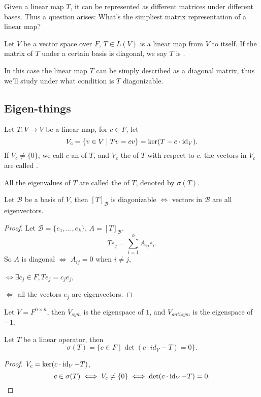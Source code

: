 Given a linear map $T$, it can be represented as different matrices
under different bases. Thus a question arises: What's the simpliest
matrix representation of a linear map?

\begin{definition}
	Let $V$ be a vector space over $F$,
	$T\in L(V)$ is a linear map from $V$ to itself.
	If the matrix of $T$ under a certain basis is diagonal, we say
	$T$ is .
\end{definition}

In this case the linear map $T$ can be simply described as a diagonal matrix,
thus we'll study under what condition is $T$ diagonizable.

\subsection{Eigen-things}
\label{sub:Eigen-things}

\begin{definition}[Eigenvalue]
	Let $T: V\to V$ be a linear map, for $c\in F$,
	let
	\[
		V_c= \{v\in V\mid Tv = cv\} = \ker (T- c\cdot \operatorname{id}_V).
	\]
	If $V_c\ne \{0\}$, we call $c$ an  of $T$,
	and $V_c$ the  of $T$ with respect to $c$.
	the vectors in $V_c$ are called .

	All the eigenvalues of $T$ are called the  of $T$,
	denoted by  $\sigma(T)$.
\end{definition}

\begin{proposition}
	Let $\mathcal{B}$ be a basis of $V$, then  $[T]_{\mathcal{B}}$ is
	diagonizable $\iff$ vectors in $\mathcal{B}$ are all eigenvectors.
\end{proposition}
\begin{proof}[Proof]
	Let $\mathcal{B}=\{e_1,\dots,e_k\}$, $A = [T]_{\mathcal{B}}$.
	\[
	Te_j = \sum_{i=1}^k A_{ij} e_i.
	\]
	So $A$ is diagonal $\iff$ $A_{ij}=0$ when $i\ne j$,

	$\iff \exists c_j\in F, Te_j = c_j e_j$,

	$\iff$ all the vectors  $e_j$ are eigenvectors.
\end{proof}
\begin{example}
    Let $V=F^{n\times n}$, then $V_{sym}$ is the eigenspace of $1$,
	and  $V_{antisym}$ is the eigenspace of $-1$.
\end{example}

\begin{lemma}
	\label{lem:eigenpoly}
	Let $T$ be a linear operator, then
	\[
	\sigma(T) = \{c\in F\mid \det (c\cdot id_V - T) = 0\}.
	\]
\end{lemma}
\begin{proof}[Proof]
    $V_c=\ker (c\cdot \operatorname{id}_V - T)$,
	\[
	c\in \sigma(T) \iff V_c \ne \{0\} \iff \det(c\cdot \operatorname{id}_V -T) = 0.
	\]

\end{proof}
